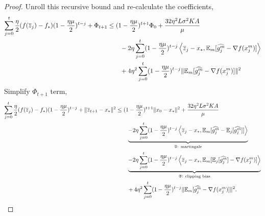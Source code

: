 \documentclass{article} %
\numberwithin{equation}{section}
\newcommand{\cirone}{\text{\ding{172}}}
\newcommand{\cirtwo}{\text{\ding{173}}}
\begin{document}
\begin{proof}
    Unroll this recursive bound and re-calculate the coefficients,
    \begin{equation}
        \begin{aligned}
            \sum_{j=0}^t\frac{\eta}{2}(f(\overline{z}_j)-f_*)(1-\frac{\eta\mu}{2})^{t-j}+\Phi_{t+1}
            &\leq (1-\frac{\eta\mu}{2})^{t+1}\Phi_0 + \frac{32\eta^2L\sigma^2KA}{\mu}\\
            &\qquad -2\eta \sum_{j=0}^t(1-\frac{\eta\mu}{2})^{t-j}\left\langle\overline{z}_j-x_*, \mathbb{E}_m [\widehat{g_j^m}-\nabla f(x_j^m)]\right\rangle \\
            &\qquad +4\eta^2\sum_{j=0}^t(1-\frac{\eta\mu}{2})^{t-j}\|\mathbb{E}_m [\widehat{g_j^m}-\nabla f(x_j^m)]\|^2 \\
        \end{aligned}
    \end{equation}
    Simplify $\Phi_{t+1}$ term,
    \begin{equation}
        \begin{aligned}
            \sum_{j=0}^t\frac{\eta}{2}(f(\overline{z}_j)-f_*)(1-\frac{\eta\mu}{2})^{t-j}+\|\overline{z}_{t+1}-x_*\|^2
            &\leq (1-\frac{\eta\mu}{2})^{t+1}\|x_0-x_*\|^2 + \frac{32\eta^2L\sigma^2KA}{\mu}\\
            &\qquad \underbrace{-2\eta \sum_{j=0}^t(1-\frac{\eta\mu}{2})^{t-j}\left\langle\overline{z}_j-x_*, \expect_m [\widehat{g_j^m}-\expect_j[\widehat{g_j^m}]]\right\rangle}_{\cirone\text{: martingale}} \\
            &\qquad \underbrace{-2\eta \sum_{j=0}^t(1-\frac{\eta\mu}{2})^{t-j}\left\langle\overline{z}_j-x_*, \expect_m [\expect_j[\widehat{g_j^m}]-\nabla f(x_j^m)]\right\rangle}_{\cirtwo\text{: clipping bias}} \\
            &\qquad + 4\eta^2\sum_{j=0}^t(1-\frac{\eta\mu}{2})^{t-j}\|\expect_m [\widehat{g_j^m}-\nabla f(x_j^m)]\|^2.
        \end{aligned}

\end{equation}
\end{proof}
\end{document}
